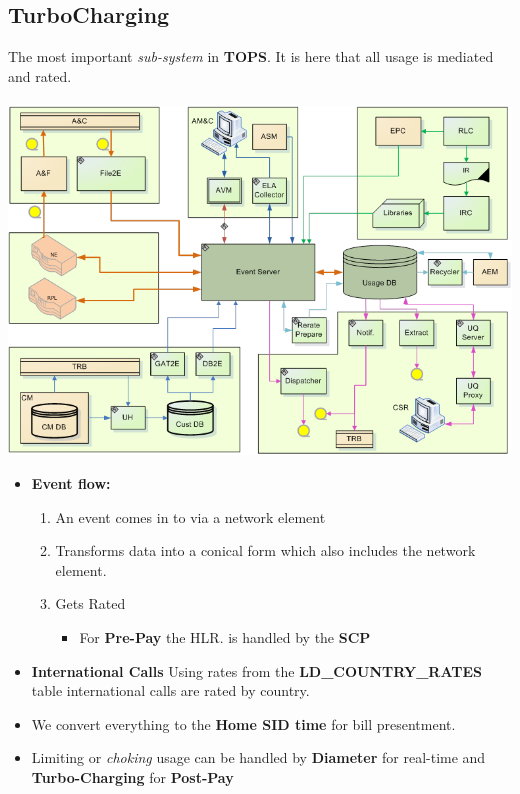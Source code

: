 \documentclass[12pt,twoside]{article}
\begin{document}
\subsection{TurboCharging}
\label{sec:orgheadline5}
   The most important \emph{sub-system} in \textbf{TOPS}. It is here that all usage is mediated and rated.\\
\\
\includegraphics[width=16cm]{Pictures/TC.png}

\newpage 
\begin{itemize}
\item \textbf{Event flow:}
\begin{enumerate}
\item An event comes in to via a network element
\item Transforms data into a conical form which also includes the
network element.
\item Gets Rated
\begin{itemize}
\item For \textbf{Pre-Pay} the HLR. is handled by the
\textbf{SCP}
\end{itemize}
\end{enumerate}
\item \textbf{International Calls} Using rates from the \textbf{LD\_COUNTRY\_RATES} table international calls are rated by country.
\item We convert everything to the \textbf{Home SID time} for bill
presentment.
\item Limiting or \emph{choking} usage can be handled by \textbf{Diameter} for
real-time and \textbf{Turbo-Charging} for \textbf{Post-Pay}
\end{itemize}
\end{document}
